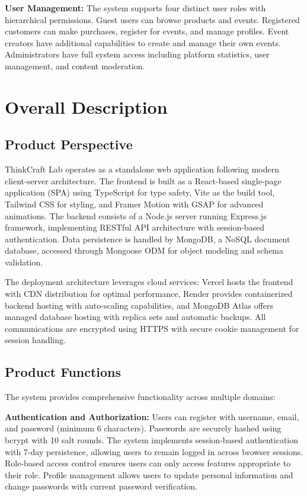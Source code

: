 ﻿\documentclass[11pt]{article}
\begin{document}
\textbf{User Management:} The system supports four distinct user roles with hierarchical permissions. Guest users can browse products and events. Registered customers can make purchases, register for events, and manage profiles. Event creators have additional capabilities to create and manage their own events. Administrators have full system access including platform statistics, user management, and content moderation.

\section{Overall Description}

\subsection{Product Perspective}
ThinkCraft Lab operates as a standalone web application following modern client-server architecture. The frontend is built as a React-based single-page application (SPA) using TypeScript for type safety, Vite as the build tool, Tailwind CSS for styling, and Framer Motion with GSAP for advanced animations. The backend consists of a Node.js server running Express.js framework, implementing RESTful API architecture with session-based authentication. Data persistence is handled by MongoDB, a NoSQL document database, accessed through Mongoose ODM for object modeling and schema validation.

The deployment architecture leverages cloud services: Vercel hosts the frontend with CDN distribution for optimal performance, Render provides containerized backend hosting with auto-scaling capabilities, and MongoDB Atlas offers managed database hosting with replica sets and automatic backups. All communications are encrypted using HTTPS with secure cookie management for session handling.

\subsection{Product Functions}
The system provides comprehensive functionality across multiple domains:

\textbf{Authentication and Authorization:} Users can register with username, email, and password (minimum 6 characters). Passwords are securely hashed using bcrypt with 10 salt rounds. The system implements session-based authentication with 7-day persistence, allowing users to remain logged in across browser sessions. Role-based access control ensures users can only access features appropriate to their role. Profile management allows users to update personal information and change passwords with current password verification.
\end{document}
